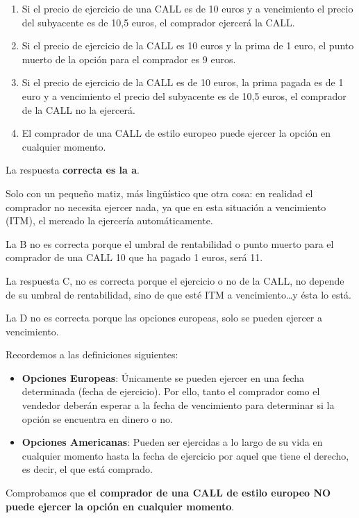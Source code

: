 \documentclass[
  letterpaper,
  DIV=11,
  numbers=noendperiod]{scrreprt}
\begin{document}
\begin{enumerate}
\def\labelenumi{\alph{enumi}.}
\item
  Si el precio de ejercicio de una CALL es de 10 euros y a vencimiento
  el precio del subyacente es de 10,5 euros, el comprador ejercerá la
  CALL.
\item
  Si el precio de ejercicio de la CALL es 10 euros y la prima de 1 euro,
  el punto muerto de la opción para el comprador es 9 euros.
\item
  Si el precio de ejercicio de la CALL es de 10 euros, la prima pagada
  es de 1 euro y a vencimiento el precio del subyacente es de 10,5
  euros, el comprador de la CALL no la ejercerá.
\item
  El comprador de una CALL de estilo europeo puede ejercer la opción en
  cualquier momento.
\end{enumerate}

\begin{tcolorbox}[enhanced jigsaw, left=2mm, opacityback=0, colback=white, breakable, arc=.35mm, bottomrule=.15mm, rightrule=.15mm, toprule=.15mm, leftrule=.75mm, colframe=quarto-callout-tip-color-frame]
\begin{minipage}[t]{5.5mm}
\textcolor{quarto-callout-tip-color}{\faLightbulb}
\end{minipage}%
\begin{minipage}[t]{\textwidth - 5.5mm}

La respuesta \textbf{correcta es la a}.

Solo con un pequeño matiz, más lingüístico que otra cosa: en realidad el
comprador no necesita ejercer nada, ya que en esta situación a
vencimiento (ITM), el mercado la ejercería automáticamente.

La B no es correcta porque el umbral de rentabilidad o punto muerto para
el comprador de una CALL 10 que ha pagado 1 euros, será 11.

La respuesta C, no es correcta porque el ejercicio o no de la CALL, no
depende de su umbral de rentabilidad, sino de que esté ITM a
vencimiento\ldots y ésta lo está.

La D no es correcta porque las opciones europeas, solo se pueden ejercer
a vencimiento.

Recordemos a las definiciones siguientes:

\begin{itemize}
\item
  \textbf{Opciones Europeas}: Únicamente se pueden ejercer en una fecha
  determinada (fecha de ejercicio). Por ello, tanto el comprador como el
  vendedor deberán esperar a la fecha de vencimiento para determinar si
  la opción se encuentra en dinero o no.
\item
  \textbf{Opciones Americanas}: Pueden ser ejercidas a lo largo de su
  vida en cualquier momento hasta la fecha de ejercicio por aquel que
  tiene el derecho, es decir, el que está comprado.
\end{itemize}

Comprobamos que \textbf{el comprador de una CALL de estilo europeo NO
puede ejercer la opción en cualquier momento}.

\end{minipage}%
\end{tcolorbox}
\end{document}
